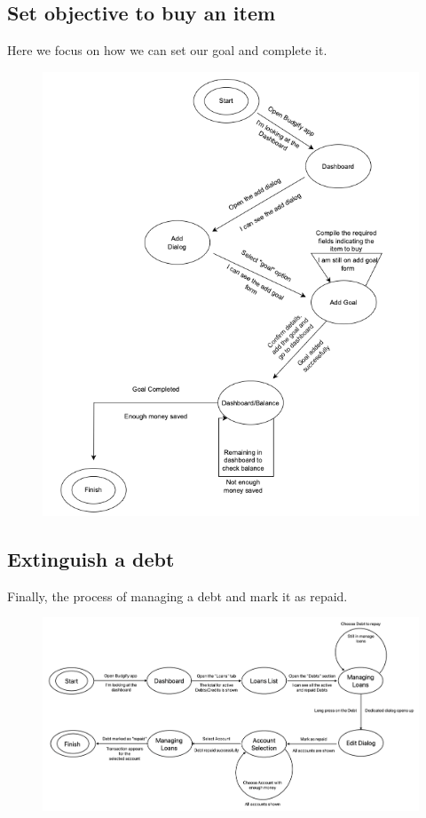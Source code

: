 \documentclass[a4paper,12pt]{article}
\begin{document}
\subsection{Set objective to buy an item}
Here we focus on how we can set our goal and complete it.
\begin{figure}[H]
    \centering
    \includegraphics[scale=0.7]{STN2.png}
\end{figure}
\vspace{5cm}
\subsection{Extinguish a debt}
Finally, the process of managing a debt and mark it as repaid.
\begin{figure}[H]
    \centering
    \includegraphics[width=\linewidth]{STN3.png}
\end{figure}
\end{document}
